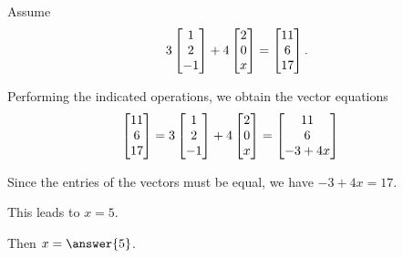 \documentclass{ximera}
\author{Chris Black}
\begin{document}
\begin{exercise}
  Assume
  \[
    3\begin{bmatrix}1\\2\\-1\end{bmatrix}+
    4\begin{bmatrix}2\\0\\x\end{bmatrix}=
    \begin{bmatrix}11\\6\\17\end{bmatrix}.
  \]
  
  \begin{hint}
    Performing the indicated operations, we obtain the vector equations
    \begin{align*}
      \begin{bmatrix}11\\6\\17\end{bmatrix}
   &= 3\begin{bmatrix}1\\2\\-1\end{bmatrix} + 4\begin{bmatrix}2 \\ 0 \\ x\end{bmatrix}
      = \begin{bmatrix}11\\6\\ -3 + 4x\end{bmatrix}
    \end{align*}
  \end{hint}

  \begin{hint}
    Since the entries of the vectors must be equal, we have $-3 + 4x = 17$.
  \end{hint}

  \begin{hint}
    This leads to $x = 5$.
  \end{hint}

  Then $x = \answer{5}$.

\end{exercise}
\end{document}
